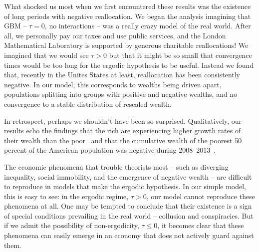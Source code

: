 What shocked us most when we first encountered these results was the existence of long periods with negative reallocation. We began the analysis imagining that GBM -- \ie $\tau=0$, no interactions -- was a really crazy model of the real world. After all, we personally pay our taxes and use public services, and the London Mathematical Laboratory is supported by generous charitable reallocations! We imagined that we would see $\tau>0$ but that it might be so small that convergence times would be too long for the ergodic hypothesis to be useful. Instead we found that, recently in the Unites States at least, reallocation has been consistently negative. In our model, this corresponds to wealths being driven apart, populations splitting into groups with positive and negative wealths, and no convergence to a stable distribution of rescaled wealth.

In retrospect, perhaps we shouldn't have been so surprised. Qualitatively, our results echo the findings that the rich are experiencing higher growth rates of their wealth than the poor~\cite{Piketty2014,wolff2014household} and that the cumulative wealth of the poorest 50 percent of the American population was negative during 2008--2013~\cite{Rios20162013,WID2017}.

The economic phenomena that trouble theorists most -- such as diverging inequality, social immobility, and the emergence of negative wealth -- are difficult to reproduce in models that make the ergodic hypothesis. In our simple model, this is easy to see: in the ergodic regime, $\tau>0$, our model cannot reproduce these phenomena at all. One may be tempted to conclude that their existence is a sign of special conditions prevailing in the real world -- collusion and conspiracies. But if we admit the possibility of non-ergodicity, $\tau\leq0$, it becomes clear that these phenomena can easily emerge in an economy that does not actively guard against them.